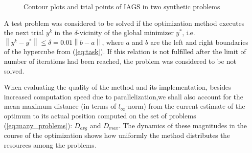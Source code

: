 \documentclass[runningheads]{llncs}
\begin{document}
\begin{figure}[ht]
    \centering
    \caption{Contour plots and trial points of IAGS in two synthetic problems}
    \label{fig:isolines}
\end{figure}

A test problem was considered to be solved if the optimization method executes the next trial
\(y^k\) in the \(\delta\)-vicinity of the global minimizer \(y^*\), i.e.
\(\left\|y^k-y^*\right\|\leqslant \delta = 0.01\left\|b-a\right\|\),
where \(a\) and \(b\) are the left and right boundaries of the hypercube from (\ref{eq:task}).
If this relation is not fulfilled after the limit of number of iterations had been reached, the problem was
considered to be not solved.

When evaluating the quality of the method and its implementation, besides increased
computation speed due to parallelization,we shall also account for the mean maximum
distance (in terms of \(l_{\infty}\)-norm) from the current estimate of the
optimum to its actual position computed on the set of problems (\ref{eq:many_problems}):
\(D_{avg}\) and \(D_{max}\).
The dynamics of these magnitudes in the course of the optimization shows how uniformly the
method distributes the resources among the problems.
\end{document}
